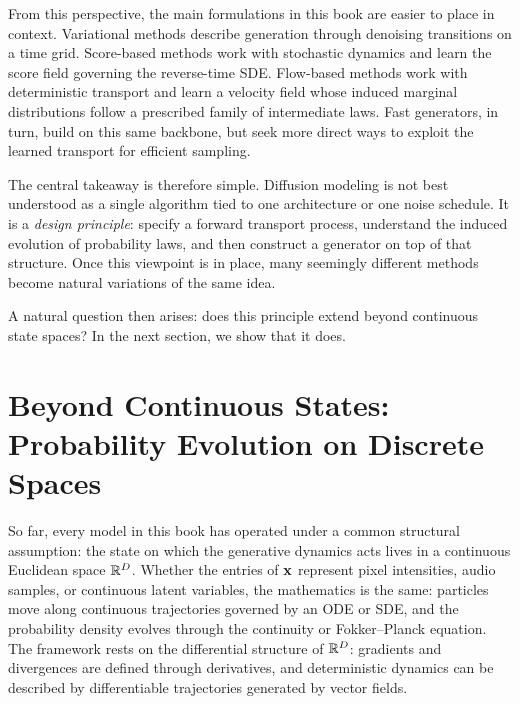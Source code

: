 From this perspective, the main formulations in this book are easier to place in context.
Variational methods describe generation through denoising transitions on a time grid. Score-based methods work with stochastic dynamics and learn the score field governing the reverse-time SDE.
Flow-based methods work with deterministic transport and learn a velocity field whose induced marginal distributions follow a prescribed family of intermediate laws.
Fast generators, in turn, build on this same backbone, but seek more direct ways to exploit the learned transport for efficient sampling.

The central takeaway is therefore simple.
Diffusion modeling is not best understood as a single algorithm tied to one architecture or one noise schedule. It is a \emph{design principle}: specify a forward transport process, understand the induced evolution of probability laws, and then construct a generator on top of that structure. Once this viewpoint is in place, many seemingly different methods become natural variations of the same idea.

A natural question then arises: does this principle extend beyond continuous state spaces? In the next section, we show that it does.

\clearpage
\newpage


\section{Beyond Continuous States: Probability Evolution on Discrete Spaces}
\label{sec:epilogue-discrete}

So far, every model in this book has operated under a common structural
assumption: the state on which the generative dynamics acts lives in a
continuous Euclidean space $\mathbb{R}^D$. Whether the entries of ${\mathbf{x}}$ represent
pixel intensities, audio samples, or continuous latent variables, the
mathematics is the same: particles move along continuous trajectories governed
by an ODE or SDE, and the probability density evolves through the continuity or
Fokker--Planck equation. The framework rests on the differential structure of $\mathbb{R}^D$: gradients and
divergences are defined through derivatives, and deterministic dynamics can be
described by differentiable trajectories generated by vector fields.

